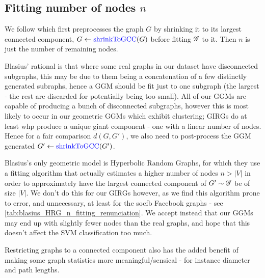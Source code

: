 \subsection{Fitting number of nodes $n$}

We follow \cite{blasius2018towards} which first preprocesses the graph $G$ by shrinking it to its largest connected component, $G \gets \operatorname{\textcolor{blue}{shrinkToGCC}}(G)$
before fitting $\mathscr{G}$ to it. Then $n$ is just the number of remaining nodes.



Blasius' rational is that where some real graphs in our dataset have disconnected subgraphs, this may be due to them being a concatenation of a few distinctly generated subraphs, hence a GGM should be fit just to one subgraph (the largest - the rest are discarded for potentially being too small). All of our GGMs are capable of producing a bunch of disconnected subgraphs, however this is most likely to occur in our geometric GGMs which exhibit clustering; GIRGs do at least whp produce a unique giant component - one with a linear number of nodes. Hence for a fair comparison $d(G, G')$, we also need to post-process the GGM generated $G' \gets \operatorname{\textcolor{blue}{shrinkToGCC}}(G')$. 

Blasius's only geometric model is Hyperbolic Random Graphs, for which they use a fitting algorithm that actually estimates a higher number of nodes $n > |V|$ in order to approximately have the largest connected component of $G' \sim \mathscr{G}$ be of size $|V|$.
We don't do this for our GIRGs however, as we find this algorithm prone to error, and unnecessary, at least for the socfb Facebook graphs - see \cref{tab:blasius_HRG_n_fitting_renunciation}. We accept instead that our GGMs may end up with slightly fewer nodes than the real graphs, and hope that this doesn't affect the SVM classification too much.



Restricting graphs to a connected component also has the added benefit of making some graph statistics more meaningful/sensical - for instance diameter and path lengths.


